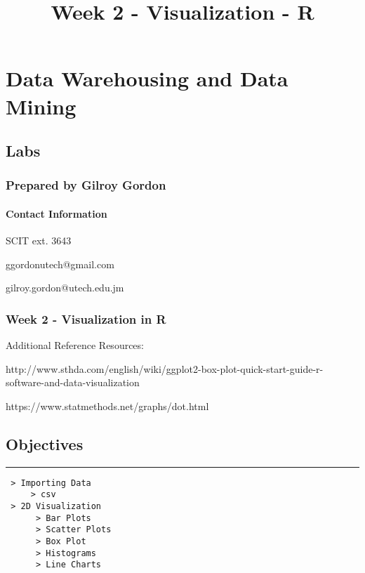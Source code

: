 \documentclass[11pt]{article}
\title{Week 2 - Visualization - R}
\begin{document}
    
    
    \maketitle
    
    

    
    \section{Data Warehousing and Data
Mining}\label{data-warehousing-and-data-mining}

\subsection{Labs}\label{labs}

\subsubsection{Prepared by Gilroy
Gordon}\label{prepared-by-gilroy-gordon}

\paragraph{Contact Information}\label{contact-information}

SCIT ext. 3643

ggordonutech@gmail.com

gilroy.gordon@utech.edu.jm

    \subsubsection{Week 2 - Visualization in
R}\label{week-2---visualization-in-r}

Additional Reference Resources:

http://www.sthda.com/english/wiki/ggplot2-box-plot-quick-start-guide-r-software-and-data-visualization

https://www.statmethods.net/graphs/dot.html

\subsection{Objectives}\label{objectives}

\begin{center}\rule{0.5\linewidth}{\linethickness}\end{center}

\begin{verbatim}
 > Importing Data
     > csv
 > 2D Visualization
      > Bar Plots
      > Scatter Plots
      > Box Plot
      > Histograms
      > Line Charts
 
\end{verbatim}
\end{document}
